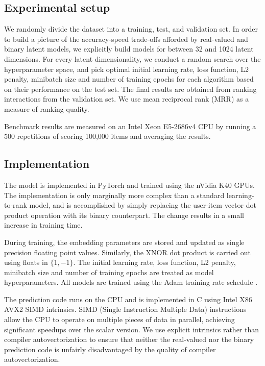 \documentclass[sigchi]{acmart}
\begin{document}
\subsection{Experimental setup}
We randomly divide the dataset into a training, test, and validation set. In order to build a picture of the accuracy-speed trade-offs afforded by real-valued and binary latent models, we explicitly build models for between 32 and 1024 latent dimensions. For every latent dimensionality, we conduct a random search over the hyperparameter space, and pick optimal initial learning rate, loss function, L2 penalty, minibatch size and number of training epochs for each algorithm based on their performance on the test set. The final results are obtained from ranking interactions from the validation set. We use mean reciprocal rank (MRR) as a measure of ranking quality.

Benchmark results are measured on an Intel Xeon E5-2686v4 CPU by running a 500 repetitions of scoring 100,000 items and averaging the results.

\subsection{Implementation}
The model is implemented in PyTorch and trained using the nVidia K40 GPUs. The implementation is only marginally more complex than a standard learning-to-rank model, and is accomplished by simply replacing the user-item vector dot product operation with its binary counterpart. The change results in a small increase in training time.

During training, the embedding parameters are stored and updated as single precision floating point values. Similarly, the XNOR dot product is carried out using floats in $\{1, -1\}$. The initial learning rate, loss function, L2 penalty, minibatch size and number of training epochs are treated as model hyperparameters. All models are trained using the Adam training rate schedule \citep{kingma2014adam}.

The prediction code runs on the CPU and is implemented in C using Intel X86 AVX2 SIMD intrinsics. SIMD (Single Instruction Multiple Data) instructions allow the CPU to operate on multiple pieces of data in parallel, achieving significant speedups over the scalar version. We use explicit intrinsics rather than compiler autovectorization to ensure that neither the real-valued nor the binary prediction code is unfairly disadvantaged by the quality of compiler autovectorization. 
\end{document}
